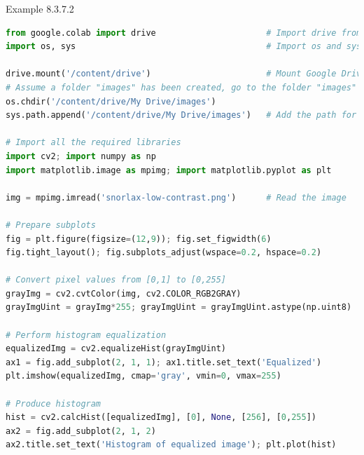 \documentclass{book}
\begin{document}
\begin{egBox}{Example 8.3.7.2}{}
    \begin{lstlisting}[language=Python, basicstyle=\ttfamily\small, keywordstyle=\color{blue}, commentstyle=\color{forestgreen}, stringstyle=\color{red}, showstringspaces=false]
from google.colab import drive                      # Import drive from google.colab package
import os, sys                                      # Import os and sys modules

drive.mount('/content/drive')                       # Mount Google Drive
# Assume a folder "images" has been created, go to the folder "images"
os.chdir('/content/drive/My Drive/images')
sys.path.append('/content/drive/My Drive/images')   # Add the path for interpreter to search

# Import all the required libraries
import cv2; import numpy as np
import matplotlib.image as mpimg; import matplotlib.pyplot as plt

img = mpimg.imread('snorlax-low-contrast.png')      # Read the image

# Prepare subplots
fig = plt.figure(figsize=(12,9)); fig.set_figwidth(6)
fig.tight_layout(); fig.subplots_adjust(wspace=0.2, hspace=0.2)

# Convert pixel values from [0,1] to [0,255]
grayImg = cv2.cvtColor(img, cv2.COLOR_RGB2GRAY)
grayImgUint = grayImg*255; grayImgUint = grayImgUint.astype(np.uint8)

# Perform histogram equalization
equalizedImg = cv2.equalizeHist(grayImgUint)
ax1 = fig.add_subplot(2, 1, 1); ax1.title.set_text('Equalized')
plt.imshow(equalizedImg, cmap='gray', vmin=0, vmax=255)

# Produce histogram
hist = cv2.calcHist([equalizedImg], [0], None, [256], [0,255])
ax2 = fig.add_subplot(2, 1, 2)
ax2.title.set_text('Histogram of equalized image'); plt.plot(hist)


\end{lstlisting}
\end{egBox}
\end{document}
